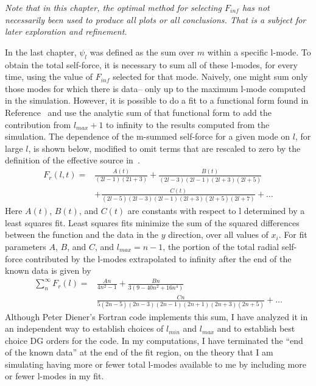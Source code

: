 {\em Note that in this chapter, the optimal method for selecting $F_{inf}$ has not necessarily been used to produce all plots or all conclusions. That is a subject for later exploration and refinement.}

In the last chapter, $\psi_l$ was defined as the sum over $m$ within a specific l-mode. To obtain the total self-force, it is necessary to sum all of these l-modes, for every time, using the value of $F_{inf}$ selected for that mode. Naively, one might sum only those modes for which there is data-- only up to the maximum l-mode computed in the simulation. However, it is possible to do a fit to a functional form found in Reference~\cite{heffernan_ottewil_wardell_modesum_basisForCode} and use the analytic sum of that functional form to add the contribution from $l_{max}+1$ to infinity to the results computed from the simulation. The dependence of the m-summed self-force for a given mode on $l$, for large $l$, is shown below, modified to omit terms that are rescaled to zero by the definition of the effective source in~\cite{wardell_vega_thornburg_diener}.
\begin{eqnarray}
  F_r(l,t)=&\frac{A(t)}{(2l-1)(21+3)}+\frac{B(t)}{(2l-3)(2l-1)(2l+3)(2l+5)}\nonumber \\
  &+\frac{C(t)}{(2l-5)(2l-3)(2l-1)(2l+3)(2l+5)(2l+7)}+\ldots
  \label{lmodefitsum}
\end{eqnarray}
Here $A(t)$, $B(t)$, and $C(t)$ are constants with respect to l determined by a least squares fit. Least squares fits minimize the sum of the squared differences between the function and the data in the $y$ direction, over all values of $x_i$. For fit parameters $A$, $B$, and $C$, and $l_{max}=n-1$, the portion of the total radial self-force contributed by the l-modes extrapolated to infinity after the end of the known data is given by
\begin{eqnarray}
  \sum_n^{\infty} F_r(l) = &\frac{An}{4n^2-1}+\frac{Bn}{3(9-40n^2+16n^4)}\nonumber\\
  &\frac{Cn}{5(2n-5)(2n-3)(2n-1)(2n+1)(2n+3)(2n+5)}+\ldots
\end{eqnarray}
Although Peter Diener's Fortran code implements this sum, I have analyzed it in an independent way to establish choices of $l_{min}$ and $l_{max}$ and to establish best choice DG orders for the code. In my computations, I have terminated the ``end of the known data'' at the end of the fit region, on the theory that I am simulating having more or fewer total l-modes available to me by including more or fewer l-modes in my fit.

